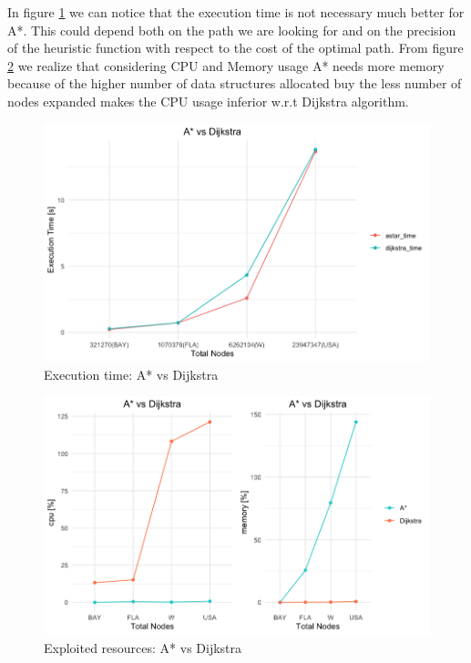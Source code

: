 \documentclass[twocolumn, switch]{article} %
\begin{document}
In figure \ref{astardijkstratime} we can notice that the execution time is not necessary much better for A*.
This could depend both on the path we are looking for and on the precision of the heuristic function with
respect to the cost of the optimal path. From figure \ref{astardijkstracpumem} we realize that considering 
CPU and Memory usage A* needs more memory
because of the higher number of data structures allocated buy the less number of nodes expanded makes
the CPU usage inferior w.r.t Dijkstra algorithm.
\begin{figure}[ht!]
  \centering
  \includegraphics[width=1\linewidth]{astar_dijkstra/execution_time.png}
  \caption{Execution time: A* vs Dijkstra}
  \label{astardijkstratime}
\end{figure}
\begin{figure}[ht!]
  \centering
  \includegraphics[width=1\linewidth]{astar_dijkstra/cpumem.png}
  \caption{Exploited resources: A* vs Dijkstra}
  \label{astardijkstracpumem}
\end{figure}
\end{document}
